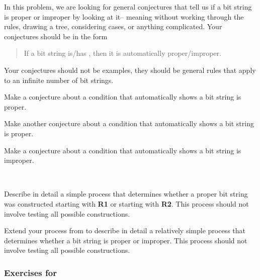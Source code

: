 \begin{exer}[\exerE] %
\label{exer_properbs_examples}
    In this problem, we are looking for general conjectures that tell us if a bit string is proper or improper by looking at it-- meaning without working through the rules, drawing a tree, considering cases, or anything complicated.  Your conjectures should be in the form
        \begin{quote}
            If a bit string is/has \underline{\hspace{1in}}, then it is automatically proper/improper.
        \end{quote}
    Your conjectures should not be examples, they should be general rules that apply to an infinite number of bit strings. 
    \begin{exerpart}
        \item Make a conjecture about a condition that automatically shows a bit string is proper.
        \item Make another conjecture about a condition that automatically shows a bit string is proper.
        \item Make a conjecture about a condition that automatically shows a bit string is improper.
    \end{exerpart}
\end{exer}

\begin{exer}[\exerE] %
\label{exer_properbs_start}
~
    \begin{exerpart}
        \item Describe in detail a simple process that determines whether a proper bit string was constructed starting with \textbf{R1} or starting with \textbf{R2}. This process should not involve testing all possible constructions.
        \item Extend your process from  to describe in detail a relatively simple process that determines whether a bit string is proper or improper.  This process should not involve testing all possible constructions.
    \end{exerpart}   
\end{exer}


\subsubsection*{Exercises for 
\subrecsets}

